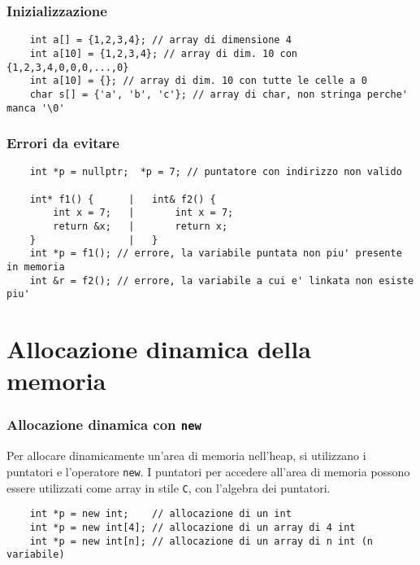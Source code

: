\documentclass[a4paper]{article}
\begin{document}
\subsubsection*{Inizializzazione}
\begin{lstlisting}
	int a[] = {1,2,3,4}; // array di dimensione 4
	int a[10] = {1,2,3,4}; // array di dim. 10 con {1,2,3,4,0,0,0,...,0}
	int a[10] = {}; // array di dim. 10 con tutte le celle a 0
	char s[] = {'a', 'b', 'c'}; // array di char, non stringa perche' manca '\0'
\end{lstlisting}

\subsubsection*{Errori da evitare}
\begin{lstlisting}
	int *p = nullptr;  *p = 7; // puntatore con indirizzo non valido

	int* f1() {      |   int& f2() {
		int x = 7;   |       int x = 7;
		return &x;   |       return x;
	}                |   }
	int *p = f1(); // errore, la variabile puntata non piu' presente in memoria
	int &r = f2(); // errore, la variabile a cui e' linkata non esiste piu'
\end{lstlisting}

\newpage

\section{Allocazione dinamica della memoria}
\subsubsection*{Allocazione dinamica con \texttt{new}}
Per allocare dinamicamente un'area di memoria nell'heap, si utilizzano i puntatori e l'operatore \verb|new|. I puntatori per
accedere all'area di memoria possono essere utilizzati come array in stile \verb|C|, con l'algebra dei puntatori.
\begin{lstlisting}
	int *p = new int;    // allocazione di un int
	int *p = new int[4]; // allocazione di un array di 4 int
	int *p = new int[n]; // allocazione di un array di n int (n variabile)
\end{lstlisting}
\end{document}
